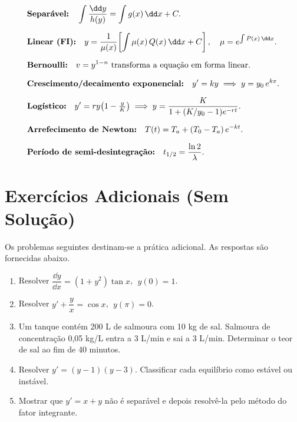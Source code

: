 \begin{tcolorbox}[
  colback=softgray, colframe=gray!60,
  title={\textbf{Formulário Essencial}},
  fonttitle=\bfseries,
  attach boxed title to top left={yshift=-2mm, xshift=4mm},
  boxed title style={colback=gray!60, rounded corners, size=small}
]
  \begin{align*}
    &\text{\textbf{Separável:}} \quad
     \int \frac{\dd y}{h(y)} = \int g(x)\,\dd x + C. \\[6pt]
    &\text{\textbf{Linear (FI):}} \quad
     y = \frac{1}{\mu(x)}\!\left[\int \mu(x)\,Q(x)\,\dd x + C\right],
     \quad \mu = e^{\int P(x)\,\dd x}. \\[6pt]
    &\text{\textbf{Bernoulli:}} \quad
     v = y^{1-n} \text{ transforma a equação em forma linear.} \\[6pt]
    &\text{\textbf{Crescimento/decaimento exponencial:}} \quad
     y' = ky \implies y = y_0\,e^{kx}. \\[6pt]
    &\text{\textbf{Logístico:}} \quad
     y' = ry\!\left(1-\tfrac{y}{K}\right) \implies
     y = \dfrac{K}{1+(K/y_0-1)e^{-rt}}. \\[6pt]
    &\text{\textbf{Arrefecimento de Newton:}} \quad
     T(t) = T_a + (T_0-T_a)\,e^{-kt}. \\[6pt]
    &\text{\textbf{Período de semi-desintegração:}} \quad
     t_{1/2} = \dfrac{\ln 2}{\lambda}.
  \end{align*}
\end{tcolorbox}

\section{Exercícios Adicionais (Sem Solução)}
\label{app:extra5}

Os problemas seguintes destinam-se a prática adicional. As respostas são fornecidas abaixo.

\begin{enumerate}
  \item Resolver $\dfrac{\dd y}{\dd x} = (1+y^2)\tan x$, $\;y(0)=1$.
  \item Resolver $y' + \dfrac{y}{x} = \cos x$, $\;y(\pi)=0$.
  \item Um tanque contém 200 L de salmoura com 10 kg de sal. Salmoura de concentração
        0{,}05 kg/L entra a 3 L/min e sai a 3 L/min. Determinar o teor de sal ao fim
        de 40 minutos.
  \item Resolver $y' = (y-1)(y-3)$. Classificar cada equilíbrio como estável ou instável.
  \item Mostrar que $y' = x + y$ não é separável e depois resolvê-la pelo método do
        fator integrante.
\end{enumerate}

